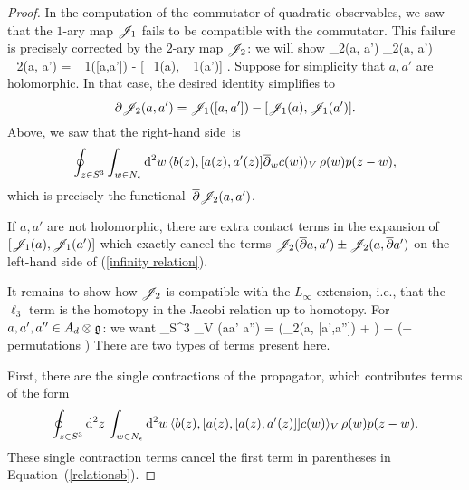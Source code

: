 \begin{proof}
In the computation of the commutator of quadratic observables,
we saw that the $1$-ary map $\mathscr J_1$ fails to be compatible with the commutator.
This failure is precisely corrected by the $2$-ary map $\mathscr J_2$: 
we will show
\beqn\label{infinity relation}
\dbar \sJ_2(a, a') \pm \sJ_2(\dbar a, a') \pm \sJ_2(a, \dbar a') = \sJ_1([a,a']) - [\sJ_1(a), \sJ_1(a')] .
\eeqn
Suppose for simplicity that $a,a'$ are holomorphic.
In that case, the desired identity simplifies to 
\[
\overline{\partial} \mathscr J_2(a, a') = \mathscr J_1([a,a']) - [\mathscr J_1(a), \mathscr J_1(a')].
\]
Above, we saw that the right-hand side~is
\[
\oint_{z \in S^3} \int_{w \in N_{\epsilon}} {\rm d}^2 w\,  \langle b(z), [a(z),a'(z)] \overline{\partial}_w c(w) \rangle_V \, \rho(w) p(z-w),
\]
which is precisely the functional~$\overline{\partial} \mathscr J_2(a,a')$. 

If $a,a'$ are not holomorphic, there are extra contact terms in the expansion of $[\mathscr J_1(a), \mathscr J_1(a')]$ which exactly cancel the terms  $\mathscr J_2(\overline{\partial} a, a') \pm \mathscr J_2(a, \overline{\partial} a')$ on the left-hand side of (\ref{infinity relation}).

It remains to show how $\mathscr J_2$ is compatible with the $L_\infty$ extension,
i.e., that the $\ell_3$ term is the homotopy in the Jacobi relation up to homotopy.
For $a,a',a'' \in A_d \otimes \mathfrak g$: we want
\beqn\label{relationsb}
\oint_{S^3} \Tr_V \left(a\wedge \partial a' \wedge \partial a''\right) = \displaystyle \left(\sJ_2(a, [a',a'']) +  \right) + \left(\left[\sJ_1(a), \sJ_2(a',a'') \right] + \; {\rm permutations} \right)
\eeqn
There are two types of terms present here. 

First, there are the single contractions of the propagator, which contributes terms of the form
\[
\oint_{z \in S^3} {\rm d}^2 z\, \int_{w \in N_{\epsilon}} {\rm d}^2 w\,  \langle b(z), [a(z), [a(z),a'(z)] ] c(w) \rangle_V \, \rho(w) p(z-w).
\]
These single contraction terms cancel the first term in parentheses in Equation~(\ref{relationsb}). 


\end{proof}

